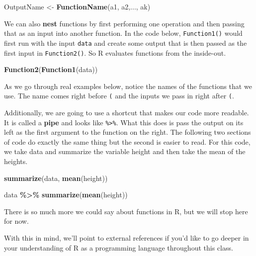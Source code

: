 \documentclass[
]{book}
\newenvironment{Shaded}{\begin{snugshade}}{\end{snugshade}}
\newcommand{\FunctionTok}[1]{\textcolor[rgb]{0.13,0.29,0.53}{\textbf{#1}}}
\newcommand{\NormalTok}[1]{#1}
\newcommand{\OtherTok}[1]{\textcolor[rgb]{0.56,0.35,0.01}{#1}}
\newcommand{\SpecialCharTok}[1]{\textcolor[rgb]{0.81,0.36,0.00}{\textbf{#1}}}
\begin{document}
\begin{Shaded}
\begin{Highlighting}[]
\NormalTok{OutputName }\OtherTok{\textless{}{-}} \FunctionTok{FunctionName}\NormalTok{(a1, a2,..., ak)}
\end{Highlighting}
\end{Shaded}

We can also \textbf{nest} functions by first performing one operation and then passing that as an input into another function. In the code below, \texttt{Function1()} would first run with the input \texttt{data} and create some output that is then passed as the first input in \texttt{Function2()}. So R evaluates functions from the inside-out.

\begin{Shaded}
\begin{Highlighting}[]
\FunctionTok{Function2}\NormalTok{(}\FunctionTok{Function1}\NormalTok{(data))}
\end{Highlighting}
\end{Shaded}

As we go through real examples below, notice the names of the functions that we use. The name comes right before \texttt{(} and the inputs we pass in right after \texttt{(}.

Additionally, we are going to use a shortcut that makes our code more readable. It is called a \textbf{pipe} and looks like \texttt{\%\textgreater{}\%}. What this does is pass the output on its left as the first argument to the function on the right. The following two sections of code do exactly the same thing but the second is easier to read. For this code, we take data and summarize the variable height and then take the mean of the heights.

\begin{Shaded}
\begin{Highlighting}[]
\FunctionTok{summarize}\NormalTok{(data, }\FunctionTok{mean}\NormalTok{(height))}

\NormalTok{data }\SpecialCharTok{\%\textgreater{}\%}
  \FunctionTok{summarize}\NormalTok{(}\FunctionTok{mean}\NormalTok{(height))}
\end{Highlighting}
\end{Shaded}

There is so much more we could say about functions in R, but we will stop here for now.

With this in mind, we'll point to external references if you'd like to go deeper in your understanding of R as a programming language throughout this class.
\end{document}

